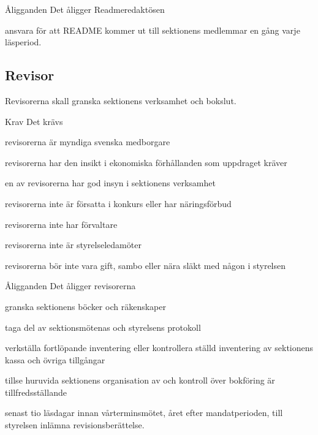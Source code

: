 \documentclass[pdfbookmarks,a4paper,11pt]{article}
\newcommand{\funktionar}[1]{%
  \subsection*{#1}\par
  \addcontentsline{toc}{subsection}{#1}}
\newlength{\itemcollength}
\newenvironment{reglemlista}{%
  \begin{list}{}{%
      \setlength{\labelwidth}{\itemcollength}%
      \setlength{\leftmargin}{\labelwidth + \labelsep}%
      \renewcommand{\makelabel}[1]{%
        \raisebox{0pt}[1ex][0pt]{%
          \makebox[\labelwidth][l]{%
            \parbox[t]{\itemcollength}{%
              \raggedright\hspace{0pt}##1}}}\hfill}%
      }}{%
  \end{list}}
\begin{document}
  \begin{reglemlista}

    \item[Åligganden]
      Det åligger Readmeredaktösen
      \begin{attlista}
        \item  ansvara för att README kommer ut till sektionens medlemmar en gång varje läsperiod.
      \end{attlista}

  \end{reglemlista}

\funktionar{Revisor}
  Revisorerna skall granska sektionens verksamhet och bokslut.

  \begin{reglemlista}

    \item[Krav]
      Det krävs
      \begin{attlista}
        \item revisorerna är myndiga svenska medborgare
        \item revisorerna har den insikt i ekonomiska förhållanden som uppdraget kräver
        \item en av revisorerna har god insyn i sektionens verksamhet
        \item revisorerna inte är försatta i konkurs eller har näringsförbud
        \item revisorerna inte har förvaltare
        \item revisorerna inte är styrelseledamöter
        \item revisorerna bör inte vara gift, sambo eller nära släkt med någon i styrelsen
      \end{attlista}

    \item[Åligganden]
      Det åligger revisorerna
      \begin{attlista}
        \item granska sektionens böcker och räkenskaper
        \item taga del av sektionsmötenas och styrelsens protokoll
        \item verkställa fortlöpande inventering eller kontrollera ställd inventering av sektionens kassa och övriga tillgångar
        \item tillse huruvida sektionens organisation av och kontroll över bokföring är tillfredsställande
        \item senast tio läsdagar innan vårterminsmötet, året
efter mandatperioden, till styrelsen inlämna revisionsberättelse. 
      \end{attlista}


\end{reglemlista}
\end{document}
